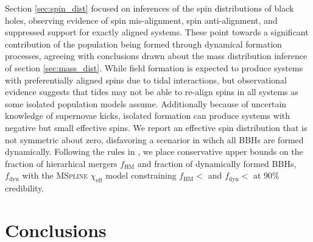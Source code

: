 Section \ref{sec:spin_dist} focused on inferences of the spin distributions of black holes, observing evidence of spin mis-alignment, spin anti-alignment, and suppressed support 
for exactly aligned systems. These point towards a significant contribution of the population being formed through dynamical formation processes, agreeing with 
conclusions drawn about the mass distribution inference of section \ref{sec:mass_dist}. While field formation is expected to produce systems with preferentially 
aligned spins due to tidal interactions, but observational evidence suggests that tides may not be able to re-align spins in all systems as some 
isolated population models assume. Additionally because of uncertain knowledge of supernovae kicks, isolated formation can produce systems with negative but small effective spins. 
We report an effective spin distribution that is not symmetric about zero, disfavoring a scenarior in wihch all BBHs are formed dynamically. Following the rules in \citet{Fishbach_2022}, 
we place conservative upper bounds on the fraction of hierarhical mergers $f_\mathrm{HM}$ and fraction of dynamically formed BBHs, $f_\mathrm{dyn}$ with 
the \textsc{MSpline} $\chi_\mathrm{eff}$ model constraining $f_\mathrm{HM} < $\result{$\macros[ChiEffective][chieff][frac_hm][10th percentile]$} 
and $f_\mathrm{dyn} < $ at 90\% credibility. 


\section{Conclusions}\label{sec:conclusion}

